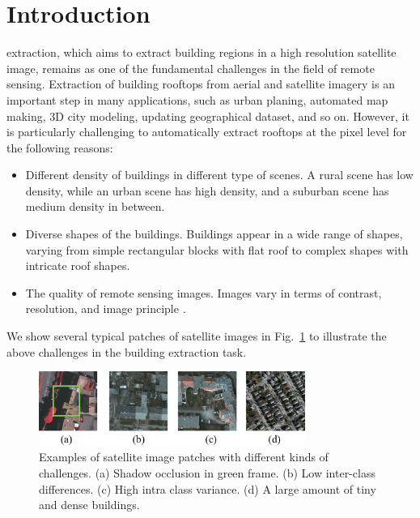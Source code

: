 %
\section{Introduction}
\label{sec:intro}

 
 extraction, which aims to extract building regions in a high resolution satellite image, remains as one of the fundamental challenges in the field of remote sensing. 
Extraction of building rooftops from aerial and satellite imagery is an important step in many applications, such as urban planing, automated map making, 3D city modeling, updating geographical dataset, and so on. 
However, it is particularly challenging to automatically extract rooftops at the pixel level for the following reasons:
%
\begin{itemize}
 \item Different density of buildings in different type of scenes. A rural scene has low density, while an urban scene has high density, and a suburban scene has medium density in between.
 \item Diverse shapes of the buildings. Buildings appear in a wide range of shapes, varying from simple rectangular blocks with flat roof to complex shapes with intricate roof shapes.
 \item The quality of remote sensing images. Images vary in terms of contrast, resolution, and image principle \cite{IEEEexample:huertas1988detecting}. 
\end{itemize}
%

We show several typical patches of satellite images in Fig.~\ref{fig:intro} to illustrate the above challenges in the building extraction task.

\begin{figure}
\centering
\includegraphics[width=8.7cm]{Figures/challenge.eps}
\caption{Examples of satellite image patches with different kinds of challenges. (a) Shadow occlusion in green frame. (b) Low inter-class differences. (c) High intra class variance. (d) A large amount of tiny and dense buildings.}
\label{fig:intro}
\end{figure}


